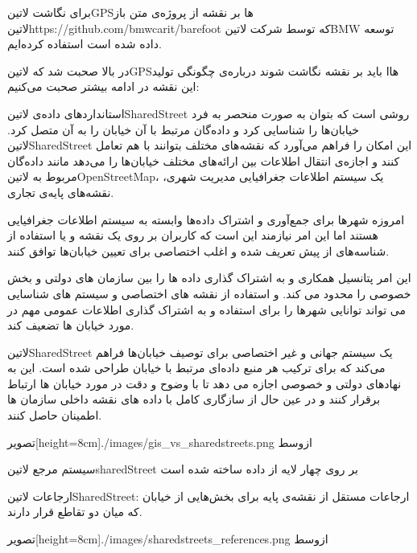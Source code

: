  برای نگاشت ‌لاتین{GPS}ها بر نقشه از پروژه‌ی متن باز  لاتین{https://github.com/bmwcarit/barefoot} که توسط شرکت  لاتین{BMW} توسعه داده شده است استفاده کرده‌ایم.


در بالا صحبت شد که ‌لاتین{GPS}هاا باید بر نقشه نگاشت شوند درباره‌ی چگونگی تولید این نقشه در ادامه بیشتر صحبت می‌کنیم:

استانداردهای داده‌ی ‌لاتین{SharedStreet} روشی است که بتوان به صورت منحصر به فرد خیابان‌ها را شناسایی کرد و داده‌گان مرتبط با آن خیابان را به آن متصل کرد.  لاتین{SharedStreet} این امکان را فراهم می‌آورد که نقشه‌های مختلف بتوانند با هم تعامل کنند و اجازه‌ی انتقال اطلاعات بین ارائه‌های مختلف خیابان‌ها را می‌دهد مانند داده‌گان مربوط به  لاتین{OpenStreetMap}، یک سیستم اطلاعات جغرافیایی مدیریت شهری، نقشه‌های پایه‌ی تجاری.

امروزه شهرها برای جمع‌آوری و اشتراک داده‌ها وابسته به سیستم اطلاعات جغرافیایی هستند اما این امر نیازمند این است که کاربران بر روی یک نقشه و یا استفاده از شناسه‌های از پیش تعریف شده و اغلب اختصاصی برای تعیین خیابان‌ها توافق کنند.

این امر پتانسیل همکاری و به اشتراک گذاری داده ها را بین سازمان های دولتی و بخش خصوصی را محدود می کند. و استفاده از نقشه های اختصاصی و سیستم های شناسایی می تواند توانایی شهرها را برای استفاده و به اشتراک گذاری اطلاعات عمومی مهم در مورد خیابان ها تضعیف کند.

‌لاتین{SharedStreet} یک سیستم جهانی و غیر اختصاصی برای توصیف خیابان‌ها فراهم می‌کند که برای ترکیب هر منبع داده‌ای مرتبط با خیابان طراحی شده است. این به نهادهای دولتی و خصوصی اجازه می دهد تا با وضوح و دقت در مورد خیابان ها ارتباط برقرار کنند و در عین حال از سازگاری کامل با داده های نقشه داخلی سازمان ها اطمینان حاصل کنند.


  ‌تصویر[height=8cm]{./images/gis_vs_sharedstreets.png}
  ‌ازوسط


 سیستم مرجع ‌لاتین{sharedStreet} بر روی چهار لایه از داده ساخته شده است


 ارجاعات ‌لاتین{SharedStreet}: ارجاعات مستقل از نقشه‌ی پایه برای بخش‌هایی از خیابان که میان دو تقاطع قرار دارند.


  ‌تصویر[height=8cm]{./images/sharedstreets_references.png}
  ‌ازوسط



